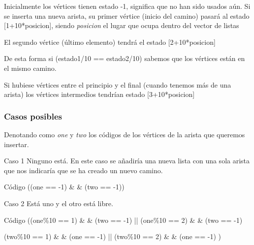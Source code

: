 \begin{frame}
	\begin{block}{ }
	Inicialmente los vértices tienen estado -1, significa que no han sido usados aún.
	Si se inserta una nueva arista, su primer vértice (inicio del camino) pasará al estado
	[1+10*posicion], siendo \textit{posicion} el lugar que ocupa dentro del vector de
	listas 
	
	El segundo vértice (último elemento) tendrá el estado [2+10*posicion]

	De esta forma si (estado1/10 == estado2/10) sabemos que los vértices están en el mismo 
	camino.
	\end{block}
	
	\begin{block}{ }
	Si hubiese vértices entre el principio y el final (cuando tenemos más de una arista) 
	los vértices intermedios tendrían estado [3+10*posicion]
	\end{block}
\end{frame}


\subsubsection{Casos posibles}
\begin{frame}
	\begin{block}
	Denotando como \textit{one} y \textit{two} los códigos de los vértices de la arista 
	que queremos insertar.
	\end{block}
\end{frame}
	
\begin{frame}
	\begin{block}{Caso 1}
	Ninguno está. En este caso se añadiría una nueva lista
	con una sola arista que nos indicaría que se ha creado un nuevo camino.
	\end{block}
	
	\begin{exampleblock}{Código}
	\hspace{1cm}((one == -1) \& \& (two == -1))
	\end{exampleblock}
\end{frame}	
	
\begin{frame}
	\begin{block}{Caso 2}
	Está uno y el otro está libre.
	\end{block}
	
	\begin{exampleblock}{Código} 
	\hspace{1cm}((one\%10 == 1) \& \& (two == -1) || (one\%10 == 2) \& \& (two == -1)    
	
	\hspace{1cm}(two\%10 == 1) \& \& (one == -1) || (two\%10 == 2) \& \& (one == -1) )
	\end{exampleblock}
\end{frame}

